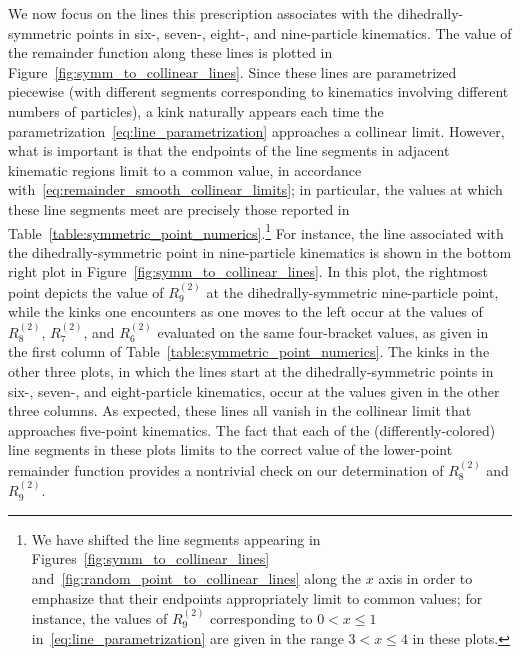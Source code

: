 \documentclass[11pt]{article}
\begin{document}
We now focus on the lines this prescription associates with the dihedrally-symmetric points in six-, seven-, eight-, and nine-particle kinematics. The value of the remainder function along these lines is plotted in Figure~\ref{fig:symm_to_collinear_lines}. Since these lines are parametrized piecewise (with different segments corresponding to kinematics involving different numbers of particles), a kink naturally appears each time the parametrization~\eqref{eq:line_parametrization} approaches a collinear limit. However, what is important is that the endpoints of the line segments in adjacent kinematic regions limit to a common value, in accordance with~\eqref{eq:remainder_smooth_collinear_limits}; in particular, the values at which these line segments meet are precisely those reported in Table~\ref{table:symmetric_point_numerics}.\footnote{We have shifted the line segments appearing in Figures~\ref{fig:symm_to_collinear_lines} and~\ref{fig:random_point_to_collinear_lines} along the $x$ axis in order to emphasize that their endpoints appropriately limit to common values; for instance, the values of $R_9^{(2)}$\! corresponding to $0 < x \leq 1$ in~\eqref{eq:line_parametrization} are given in the range $3 < x \leq 4$ in these plots.} For instance, the line associated with the dihedrally-symmetric point in nine-particle kinematics is shown in the bottom right plot in Figure~\ref{fig:symm_to_collinear_lines}. In this plot, the rightmost point depicts the value of $R_9^{(2)}$\! at the dihedrally-symmetric nine-particle point, while the kinks one encounters as one moves to the left occur at the values of $R_8^{(2)}$\!, $R_7^{(2)}$\!, and $R_6^{(2)}$\! evaluated on the same four-bracket values, as given in the first column of Table~\ref{table:symmetric_point_numerics}. The kinks in the other three plots, in which the lines start at the dihedrally-symmetric points in six-, seven-, and eight-particle kinematics, occur at the values given in the other three columns. As expected, these lines all vanish in the collinear limit that approaches five-point kinematics. The fact that each of the (differently-colored) line segments in these plots limits to the correct value of the lower-point remainder function provides a nontrivial check on our determination of $R_8^{(2)}$\! and $R_9^{(2)}$\!.  
\end{document}
